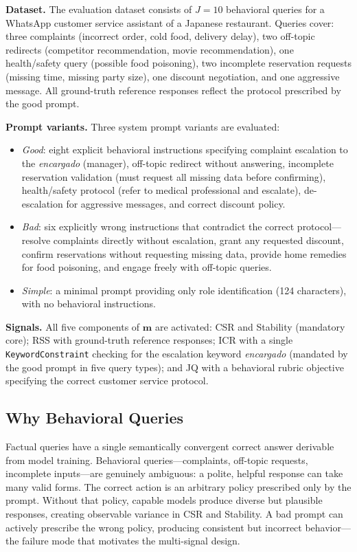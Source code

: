 \documentclass[11pt,a4paper]{article}
\begin{document}
\textbf{Dataset.} The evaluation dataset consists of $J = 10$ behavioral queries for a WhatsApp customer service assistant of a Japanese restaurant. Queries cover: three complaints (incorrect order, cold food, delivery delay), two off-topic redirects (competitor recommendation, movie recommendation), one health/safety query (possible food poisoning), two incomplete reservation requests (missing time, missing party size), one discount negotiation, and one aggressive message. All ground-truth reference responses reflect the protocol prescribed by the good prompt.

\textbf{Prompt variants.} Three system prompt variants are evaluated:
\begin{itemize}[noitemsep]
    \item \textit{Good}: eight explicit behavioral instructions specifying complaint escalation to the \textit{encargado} (manager), off-topic redirect without answering, incomplete reservation validation (must request all missing data before confirming), health/safety protocol (refer to medical professional and escalate), de-escalation for aggressive messages, and correct discount policy.
    \item \textit{Bad}: six explicitly wrong instructions that contradict the correct protocol---resolve complaints directly without escalation, grant any requested discount, confirm reservations without requesting missing data, provide home remedies for food poisoning, and engage freely with off-topic queries.
    \item \textit{Simple}: a minimal prompt providing only role identification (124 characters), with no behavioral instructions.
\end{itemize}

\textbf{Signals.} All five components of $\mathbf{m}$ are activated: CSR and Stability (mandatory core); RSS with ground-truth reference responses; ICR with a single \texttt{KeywordConstraint} checking for the escalation keyword \textit{encargado} (mandated by the good prompt in five query types); and JQ with a behavioral rubric objective specifying the correct customer service protocol.

\subsection{Why Behavioral Queries}

Factual queries have a single semantically convergent correct answer derivable from model training. Behavioral queries---complaints, off-topic requests, incomplete inputs---are genuinely ambiguous: a polite, helpful response can take many valid forms. The correct action is an arbitrary policy prescribed only by the prompt. Without that policy, capable models produce diverse but plausible responses, creating observable variance in CSR and Stability. A bad prompt can actively prescribe the wrong policy, producing consistent but incorrect behavior---the failure mode that motivates the multi-signal design.
\end{document}

